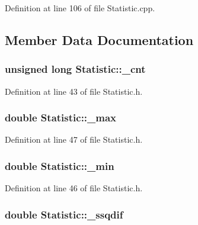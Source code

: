 Definition at line 106 of file Statistic.\+cpp.



\subsection{Member Data Documentation}
\hypertarget{class_statistic_a7fef0bb20a000cbf730effea59e27981}{
\subsubsection[{\+\_\+cnt}]{\setlength{\rightskip}{0pt plus 5cm}unsigned long Statistic\+::\+\_\+cnt\hspace{0.3cm}{\ttfamily [protected]}}}\label{class_statistic_a7fef0bb20a000cbf730effea59e27981}


Definition at line 43 of file Statistic.\+h.

\hypertarget{class_statistic_a7239cdbbfe42ffa0a4bc3957f00ce578}{
\subsubsection[{\+\_\+max}]{\setlength{\rightskip}{0pt plus 5cm}double Statistic\+::\+\_\+max\hspace{0.3cm}{\ttfamily [protected]}}}\label{class_statistic_a7239cdbbfe42ffa0a4bc3957f00ce578}


Definition at line 47 of file Statistic.\+h.

\hypertarget{class_statistic_a88f044d1ba01dfa1a30094ada14beb7b}{
\subsubsection[{\+\_\+min}]{\setlength{\rightskip}{0pt plus 5cm}double Statistic\+::\+\_\+min\hspace{0.3cm}{\ttfamily [protected]}}}\label{class_statistic_a88f044d1ba01dfa1a30094ada14beb7b}


Definition at line 46 of file Statistic.\+h.

\hypertarget{class_statistic_a9620f6ca72b93c559fbe77235d1f60a8}{
\subsubsection[{\+\_\+ssqdif}]{\setlength{\rightskip}{0pt plus 5cm}double Statistic\+::\+\_\+ssqdif\hspace{0.3cm}{\ttfamily [protected]}}}\label{class_statistic_a9620f6ca72b93c559fbe77235d1f60a8}


